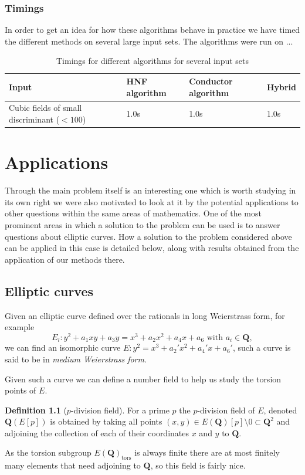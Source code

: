 \documentclass[a4paper,abstracton,bibtotoc]{scrreprt}
\theoremstyle{definition}
\newtheorem{defn}{Definition}
\newcommand{\QQ}{\mathbf{Q}}
\begin{document}
\subsection{Timings}
In order to get an idea for how these algorithms behave in practice we have timed the different methods on several large input sets.
The algorithms were run on ...
\begin{table}[h]
\begin{tabular}{|p{14em}|l|l|l|}
\hline
Input & HNF algorithm & Conductor algorithm & Hybrid \\
\hline
Cubic fields of small discriminant ($< 100$) & 1.0s & 1.0s & 1.0s \\
\hline
\end{tabular}
\caption{\label{tab:timings} Timings for different algorithms for several input sets}
\end{table}


\chapter{Applications}

Through the main problem itself is an interesting one which is worth studying in its own right we were also motivated to look at it by the potential applications to other questions within the same areas of mathematics.
One of the most prominent areas in which a solution to the problem can be used is to answer questions about elliptic curves.
How a solution to the problem considered above can be applied in this case is detailed below, along with results obtained from the application of our methods there.

\section{Elliptic curves}
\label{sec:ellapp}
Given an elliptic curve defined over the rationals in long Weierstrass form, for example
\[E_l \colon y^2 + a_1xy + a_3y = x^3 + a_2x^2 + a_4x + a_6\text{ with }a_i \in \QQ,\]
we can find an isomorphic curve $E \colon y^2 = x^3 + a_2'x^2 + a_4'x + a_6'$, such a curve is said to be in \emph{medium Weierstrass form}.

Given such a curve we can define a number field to help us study the torsion points of $E$.
\begin{defn}[$p$-division field] %
For a prime $p$ the $p$-division field of $E$, denoted $\QQ(E[p])$ is obtained by taking all points $(x,y) \in E(\QQ)[p]\setminus 0\subset \QQ^2$ and adjoining the collection of each of their coordinates $x$ and $y$ to $\QQ$.
\end{defn}
As the torsion subgroup $E(\QQ)_\text{tors}$ is always finite there are at most finitely many elements that need adjoining to $\QQ$, so this field is fairly nice.
\end{document}
